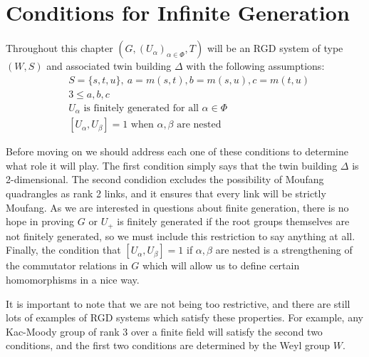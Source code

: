 \documentclass[class=book, crop=false,12 pt]{standalone}
\begin{document}
\chapter{Conditions for Infinite Generation}
\label{ch:general}

Throughout this chapter $(G,(U_\alpha)_{\alpha\in \Phi},T)$ will be an RGD system of type $(W,S)$ and associated twin building $\Delta$ with the following assumptions:
\smallskip
\begin{equation}
	\label{assume}
	\tag{A} 
\begin{aligned}
	&S=\{s,t,u\},\: a=m(s,t),b=m(s,u),c=m(t,u)\\
	&3\le a,b,c\\
	&U_\alpha \text{ is finitely generated for all }\alpha\in \Phi\\
	&[U_\alpha,U_\beta]=1\text{ when }\alpha,\beta \text{ are nested}
\end{aligned}
\end{equation}

Before moving on we should address each one of these conditions to determine what role it will play. The first condition simply says that the twin building $\Delta$ is 2-dimensional. The second condidion excludes the possibility of Moufang quadrangles as rank 2 links, and it ensures that every link will be strictly Moufang. As we are interested in questions about finite generation, there is no hope in proving $G$ or $U_+$ is finitely generated if the root groups themselves are not finitely generated, so we must include this restriction to say anything at all. Finally, the condition that $[U_\alpha,U_\beta]=1$ if $\alpha,\beta$ are nested is a strengthening of the commutator relations in $G$ which will allow us to define certain homomorphisms in a nice way.

It is important to note that we are not being too restrictive, and there are still lots of examples of RGD systems which satisfy these properties. For example, any Kac-Moody group of rank 3 over a finite field will satisfy the second two conditions, and the first two conditions are determined by the Weyl group $W.$
\end{document}
